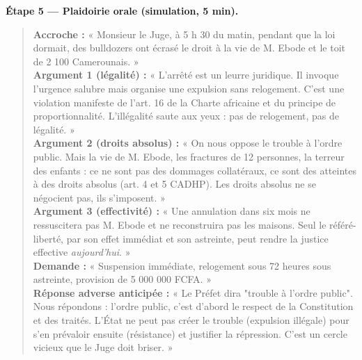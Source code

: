 \documentclass[11pt]{article}
\begin{document}
\begin{exoresolu}
\vspace{0.5cm}
\textbf{Étape 5 — Plaidoirie orale (simulation, 5 min).}

\begin{quote}
\small
\textbf{Accroche :} « Monsieur le Juge, à 5 h 30 du matin, pendant que la loi dormait, des bulldozers ont écrasé le droit à la vie de M. Ebode et le toit de 2 100 Camerounais. »\\
\textbf{Argument 1 (légalité) :} « L'arrêté est un leurre juridique. Il invoque l'urgence salubre mais organise une expulsion sans relogement. C'est une violation manifeste de l'art. 16 de la Charte africaine et du principe de proportionnalité. L'illégalité saute aux yeux : pas de relogement, pas de légalité. »\\
\textbf{Argument 2 (droits absolus) :} « On nous oppose le trouble à l'ordre public. Mais la vie de M. Ebode, les fractures de 12 personnes, la terreur des enfants : ce ne sont pas des dommages collatéraux, ce sont des atteintes à des droits absolus (art. 4 et 5 CADHP). Les droits absolus ne se négocient pas, ils s'imposent. »\\
\textbf{Argument 3 (effectivité) :} « Une annulation dans six mois ne ressuscitera pas M. Ebode et ne reconstruira pas les maisons. Seul le référé-liberté, par son effet immédiat et son astreinte, peut rendre la justice effective \emph{aujourd'hui}. »\\
\textbf{Demande :} « Suspension immédiate, relogement sous 72 heures sous astreinte, provision de 5 000 000 FCFA. »\\
\textbf{Réponse adverse anticipée :} « Le Préfet dira "trouble à l'ordre public". Nous répondons : l'ordre public, c'est d'abord le respect de la Constitution et des traités. L'État ne peut pas créer le trouble (expulsion illégale) pour s'en prévaloir ensuite (résistance) et justifier la répression. C'est un cercle vicieux que le Juge doit briser. »
\end{quote}

\end{exoresolu}
\end{document}
